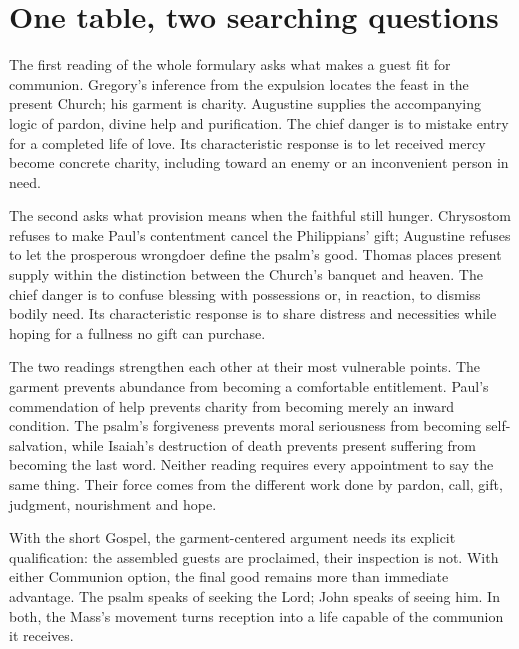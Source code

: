 \section{One table, two searching questions}
The first reading of the whole formulary asks what makes a guest fit for communion. Gregory's inference from the expulsion locates the feast in the present Church; his garment is charity. Augustine supplies the accompanying logic of pardon, divine help and purification. The chief danger is to mistake entry for a completed life of love. Its characteristic response is to let received mercy become concrete charity, including toward an enemy or an inconvenient person in need.

The second asks what provision means when the faithful still hunger. Chrysostom refuses to make Paul's contentment cancel the Philippians' gift; Augustine refuses to let the prosperous wrongdoer define the psalm's good. Thomas places present supply within the distinction between the Church's banquet and heaven. The chief danger is to confuse blessing with possessions or, in reaction, to dismiss bodily need. Its characteristic response is to share distress and necessities while hoping for a fullness no gift can purchase.

The two readings strengthen each other at their most vulnerable points. The garment prevents abundance from becoming a comfortable entitlement. Paul's commendation of help prevents charity from becoming merely an inward condition. The psalm's forgiveness prevents moral seriousness from becoming self-salvation, while Isaiah's destruction of death prevents present suffering from becoming the last word. Neither reading requires every appointment to say the same thing. Their force comes from the different work done by pardon, call, gift, judgment, nourishment and hope.

With the short Gospel, the garment-centered argument needs its explicit qualification: the assembled guests are proclaimed, their inspection is not. With either Communion option, the final good remains more than immediate advantage. The psalm speaks of seeking the Lord; John speaks of seeing him. In both, the Mass's movement turns reception into a life capable of the communion it receives.
